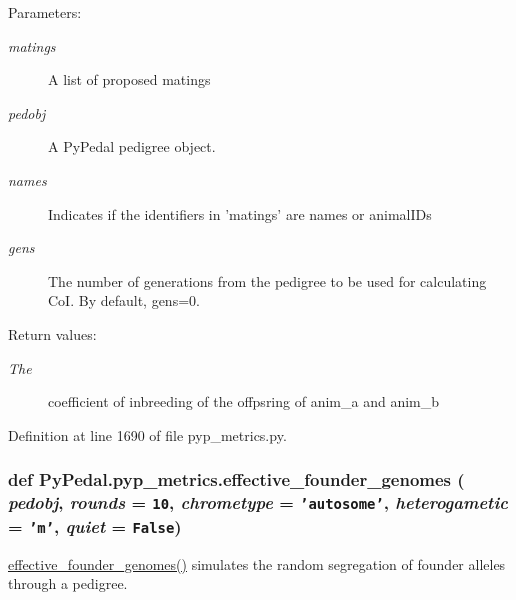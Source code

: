 \begin{Desc}
\item[Parameters:]
\begin{description}
\item[{\em matings}]A list of proposed matings \item[{\em pedobj}]A Py\-Pedal pedigree object. \item[{\em names}]Indicates if the identifiers in 'matings' are names or animal\-IDs \item[{\em gens}]The number of generations from the pedigree to be used for calculating Co\-I. By default, gens=0. \end{description}
\end{Desc}
\begin{Desc}
\item[Return values:]
\begin{description}
\item[{\em The}]coefficient of inbreeding of the offpsring of anim\_\-a and anim\_\-b \end{description}
\end{Desc}


Definition at line 1690 of file pyp\_\-metrics.py.\hypertarget{namespacePyPedal_1_1pyp__metrics_e86f472bfb3705f8a75323d161f6a358}{
\subsubsection[effective\_\-founder\_\-genomes]{\setlength{\rightskip}{0pt plus 5cm}def Py\-Pedal.pyp\_\-metrics.effective\_\-founder\_\-genomes ( {\em pedobj},  {\em rounds} = {\tt 10},  {\em chrometype} = {\tt 'autosome'},  {\em heterogametic} = {\tt 'm'},  {\em quiet} = {\tt False})}}
\label{namespacePyPedal_1_1pyp__metrics_e86f472bfb3705f8a75323d161f6a358}


\hyperlink{namespacePyPedal_1_1pyp__metrics_e86f472bfb3705f8a75323d161f6a358}{effective\_\-founder\_\-genomes()} simulates the random segregation of founder alleles through a pedigree. 

